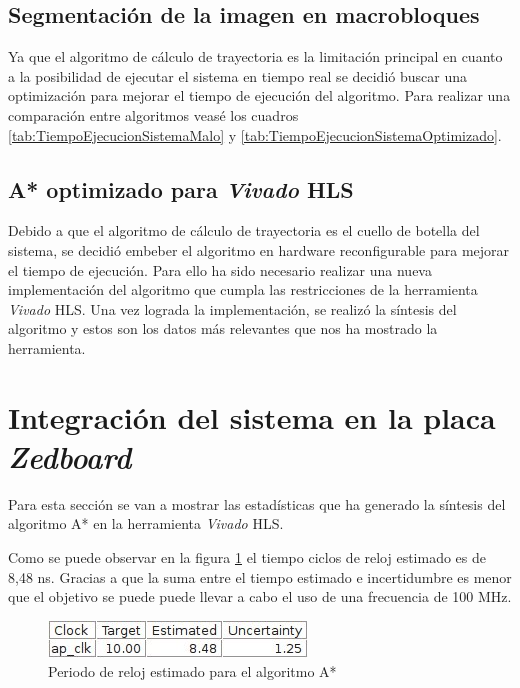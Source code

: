 \subsection{Segmentación de la imagen en macrobloques}

Ya que el algoritmo de cálculo de trayectoria es la limitación principal en cuanto a la posibilidad de ejecutar el sistema en tiempo real se decidió buscar una optimización para mejorar el tiempo de ejecución del algoritmo. Para realizar una comparación entre algoritmos veasé los cuadros \ref{tab:TiempoEjecucionSistemaMalo} y \ref{tab:TiempoEjecucionSistemaOptimizado}.

\subsection{A* optimizado para \emph{Vivado} \acs{HLS}}

Debido a que el algoritmo de cálculo de trayectoria es el cuello de botella del sistema, se decidió embeber el algoritmo en hardware reconfigurable para mejorar el tiempo de ejecución. Para ello ha sido necesario realizar una nueva implementación del algoritmo que cumpla las restricciones de la herramienta \emph{Vivado} \ac{HLS}. Una vez lograda la implementación, se realizó la síntesis del algoritmo y estos son los datos más relevantes que nos ha mostrado la herramienta.

\section{Integración del sistema en la placa \emph{Zedboard}}

Para esta sección se van a mostrar las estadísticas que ha generado la síntesis del algoritmo A* en la herramienta \emph{Vivado} \ac{HLS}.

Como se puede observar en la figura \ref{fig:periodoEstimado} el tiempo ciclos de reloj estimado es de 8,48 ns. Gracias a que la suma entre el tiempo estimado e incertidumbre es menor que el objetivo se puede puede llevar a cabo el uso de una frecuencia de 100 \acs{MHz}.

\begin{figure}[htbp]
 \centering
    \includegraphics[width=.6\textwidth]{./figures/PeriodoEstimado.jpeg}
 \caption{Periodo de reloj estimado para el algoritmo A*}
 \label{fig:periodoEstimado}
\end{figure}


